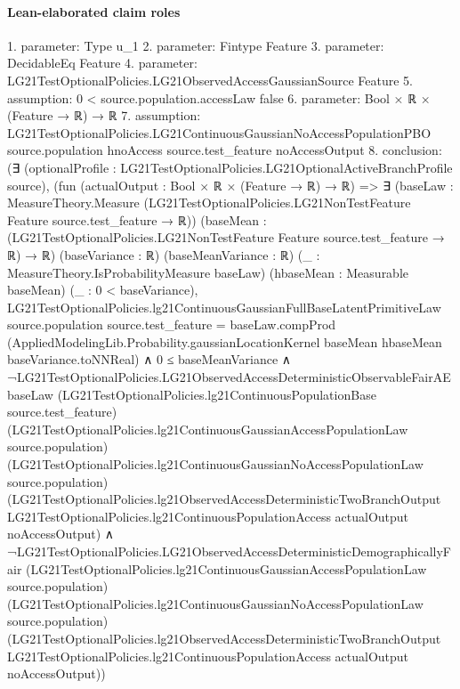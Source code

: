 \documentclass[10pt]{article}
\begin{document}
\paragraph{Lean-elaborated claim roles}\begin{ReviewVerbatim}
1. parameter: Type u_1
2. parameter: Fintype Feature
3. parameter: DecidableEq Feature
4. parameter: LG21TestOptionalPolicies.LG21ObservedAccessGaussianSource Feature
5. assumption: 0 < source.population.accessLaw {false}
6. parameter: Bool × ℝ × (Feature → ℝ) → ℝ
7. assumption: LG21TestOptionalPolicies.LG21ContinuousGaussianNoAccessPopulationPBO source.population hnoAccess source.test_feature
  noAccessOutput
8. conclusion: (∃ (optionalProfile : LG21TestOptionalPolicies.LG21OptionalActiveBranchProfile source),
    (fun (actualOutput : Bool × ℝ × (Feature → ℝ) → ℝ) =>
        ∃ (baseLaw :
          MeasureTheory.Measure (LG21TestOptionalPolicies.LG21NonTestFeature Feature source.test_feature → ℝ)) (baseMean
          : (LG21TestOptionalPolicies.LG21NonTestFeature Feature source.test_feature → ℝ) → ℝ) (baseVariance : ℝ)
          (baseMeanVariance : ℝ) (_ : MeasureTheory.IsProbabilityMeasure baseLaw) (hbaseMean : Measurable baseMean) (_ :
          0 < baseVariance),
          LG21TestOptionalPolicies.lg21ContinuousGaussianFullBaseLatentPrimitiveLaw source.population
                source.test_feature =
              baseLaw.compProd
                (AppliedModelingLib.Probability.gaussianLocationKernel baseMean hbaseMean baseVariance.toNNReal) ∧
            0 ≤ baseMeanVariance ∧
              ¬LG21TestOptionalPolicies.LG21ObservedAccessDeterministicObservableFairAE baseLaw
                    (LG21TestOptionalPolicies.lg21ContinuousPopulationBase source.test_feature)
                    (LG21TestOptionalPolicies.lg21ContinuousGaussianAccessPopulationLaw source.population)
                    (LG21TestOptionalPolicies.lg21ContinuousGaussianNoAccessPopulationLaw source.population)
                    (LG21TestOptionalPolicies.lg21ObservedAccessDeterministicTwoBranchOutput
                      LG21TestOptionalPolicies.lg21ContinuousPopulationAccess actualOutput noAccessOutput) ∧
                ¬LG21TestOptionalPolicies.LG21ObservedAccessDeterministicDemographicallyFair
                    (LG21TestOptionalPolicies.lg21ContinuousGaussianAccessPopulationLaw source.population)
                    (LG21TestOptionalPolicies.lg21ContinuousGaussianNoAccessPopulationLaw source.population)
                    (LG21TestOptionalPolicies.lg21ObservedAccessDeterministicTwoBranchOutput
                      LG21TestOptionalPolicies.lg21ContinuousPopulationAccess actualOutput noAccessOutput))

\end{ReviewVerbatim}
\end{document}
